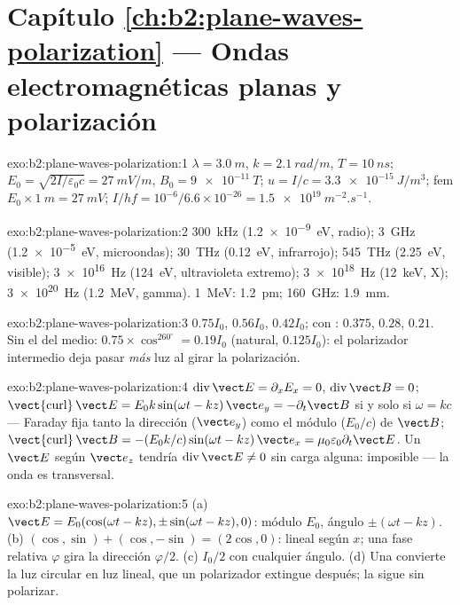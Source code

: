 \section*{Capítulo \ref{ch:b2:plane-waves-polarization} --- Ondas electromagnéticas planas y polarización}

\begin{solution}{exo:b2:plane-waves-polarization:1}
$\lambda = \qty{3.0}{m}$, $k = \qty{2.1}{rad/m}$, $T = \qty{10}{ns}$; $E_0 = \sqrt{2I/\varepsilon_0c}
= \qty{27}{mV/m}$, $B_0 = \qty{9e-11}{T}$; $u = I/c = \qty{3.3e-15}{J/m^3}$; fem
$E_0 \times \qty{1}{m} = \qty{27}{mV}$; $I/hf = 10^{-6}/6.6 \times 10^{-26} = \qty{1.5e19}{m^{-2}.s^{-1}}$.
\end{solution}

\begin{solution}{exo:b2:plane-waves-polarization:2}
\qty{300}{kHz} (\qty{1.2e-9}{eV}, radio); \qty{3}{GHz} (\qty{1.2e-5}{eV}, microondas);
\qty{30}{THz} (\qty{0.12}{eV}, infrarrojo); \qty{545}{THz} (\qty{2.25}{eV}, visible);
\qty{3e16}{Hz} (\qty{124}{eV}, ultravioleta extremo); \qty{3e18}{Hz} (\qty{12}{keV}, X);
\qty{3e20}{Hz} (\qty{1.2}{MeV}, gamma). \qty{1}{MeV}: \qty{1.2}{pm}; \qty{160}{GHz}: \qty{1.9}{mm}.
\end{solution}

\begin{solution}{exo:b2:plane-waves-polarization:3}
$0.75I_0$, $0.56I_0$, $0.42I_0$; con : $0.375$, $0.28$, $0.21$. Sin el
del medio: $0.75 \times \cos^260^\circ = 0.19I_0$ (natural, $0.125I_0$): el
polarizador intermedio deja pasar \emph{más} luz al girar la polarización.
\end{solution}

\begin{solution}{exo:b2:plane-waves-polarization:4}
$\operatorname{div}\vect E = \partial_xE_x = 0$, $\operatorname{div}\vect B = 0$;
$\operatorname{\vect{curl}}\vect E = E_0k\sin(\omega t - kz)\,\vect e_y = -\partial_t\vect B$ si y solo si $\omega =
kc$ --- Faraday fija tanto la dirección ($\vect e_y$) como el módulo
($E_0/c$) de $\vect B$; $\operatorname{\vect{curl}}\vect B = -(E_0k/c)\sin(\omega t - kz)\,\vect e_x
= \mu_0\varepsilon_0\partial_t\vect E$. Un $\vect E$ según $\vect e_z$ tendría $\operatorname{div}
\vect E \ne 0$ sin carga alguna: imposible --- la onda es transversal.
\end{solution}

\begin{solution}{exo:b2:plane-waves-polarization:5}
(a) $\vect E = E_0(\cos(\omega t - kz), \pm\sin(\omega t - kz), 0)$: módulo $E_0$,
ángulo $\pm(\omega t - kz)$. (b) $(\cos, \sin) + (\cos, -\sin) = (2\cos, 0)$: lineal
según $x$; una fase relativa $\varphi$ gira la dirección $\varphi/2$. (c)
$I_0/2$ con cualquier ángulo. (d) Una  convierte la
luz circular en luz lineal, que un polarizador extingue después; la  sigue sin polarizar.
\end{solution}

